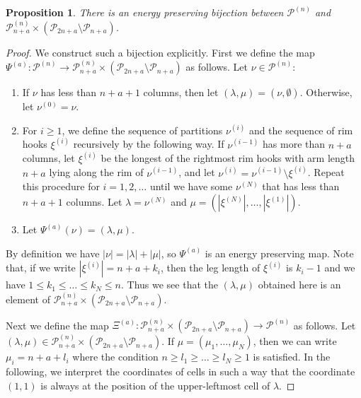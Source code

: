 \documentclass[sn-mathphys-num]{sn-jnl}%
\theoremstyle{thmstyleone}%
\newtheorem{proposition}[theorem]{Proposition}%
\theoremstyle{thmstyletwo}%
\theoremstyle{thmstylethree}%
\begin{document}
\begin{proposition}\label{prop:12}
There is an energy preserving bijection between
 $\mathscr{P}^{(n)}$ and $\mathscr{P}^{(n)}_{n+a} \times 
(\mathscr{P}_{2n+a} \setminus \mathscr{P}_{n+a}) $.
\end{proposition}
\begin{proof}
We construct such a bijection explicitly.
First we define the map $\Psi^{(a)} : \mathscr{P}^{(n)} \rightarrow \mathscr{P}^{(n)}_{n+a} \times (\mathscr{P}_{2n+a} \setminus \mathscr{P}_{n+a})$
as follows. Let $\nu \in \mathscr{P}^{(n)}$:
\begin{enumerate}
\item 
If $\nu$ has less than $n+a+1$ columns, then let $(\lambda, \mu) = (\nu, \emptyset)$.
Otherwise, let $\nu^{(0)} = \nu$.
\item
For $i \geq 1$, we define the sequence of partitions $\nu^{(i)}$ and the sequence of
rim hooks $\xi^{(i)}$ recursively by the following way.
%
If $\nu^{(i-1)}$ has more than $n+a$ columns, let $\xi^{(i)}$ be the longest of the
rightmost rim hooks
with arm length $n+a$ lying along the rim of $\nu^{(i-1)}$, and
let $\nu^{(i)} =\nu^{(i-1)} \setminus \xi^{(i)}$.
%
Repeat this procedure for $i=1,2,\dots$ until we have some $\nu^{(N)}$ that 
has less than $n+a+1$ columns.
Let $\lambda = \nu^{(N)}$ and $\mu = (|\xi^{(N)}|, \dots, |\xi^{(1)}|)$.
\item
Let $\Psi^{(a)} (\nu) = (\lambda, \mu)$.
\end{enumerate}
By definition we have $|\nu| = |\lambda| + |\mu|$, so $\Psi^{(a)}$ is an energy preserving map.
Note that, if we write $|\xi^{(i)}|=n+a+k_i$,
then the leg length of $\xi^{(i)}$ is $k_i-1$ and
we have $1 \leq k_1 \leq \dots \leq k_N \leq n$.
Thus we see that the $(\lambda, \mu)$ obtained here is
an element of $\mathscr{P}^{(n)}_{n+a} \times 
(\mathscr{P}_{2n+a} \setminus \mathscr{P}_{n+a})$.

Next we define the map $\Xi^{(a)} : \mathscr{P}^{(n)}_{n+a} \times (\mathscr{P}_{2n+a} \setminus \mathscr{P}_{n+a}) \rightarrow \mathscr{P}^{(n)} $
as follows. 
Let $(\lambda, \mu) \in \mathscr{P}^{(n)}_{n+a} \times 
(\mathscr{P}_{2n+a} \setminus \mathscr{P}_{n+a})$.
If $\mu = (\mu_1, \dots, \mu_N)$, then we can write $\mu_i = n+a+l_i$ where
the condition $n \geq l_1 \geq \dots \geq l_N \geq 1$ is satisfied. 
In the following, we interpret the coordinates of cells in such a way that
the coordinate $(1,1)$ is always at the position of the upper-leftmost cell of $\lambda$.


\end{proof}
\end{document}

